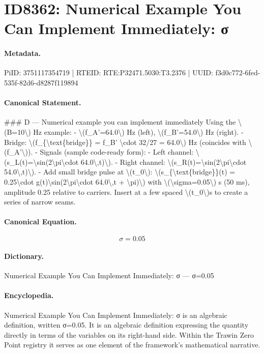 \section*{ID8362: Numerical Example You Can Implement Immediately: σ}
\paragraph{Metadata.}
PiID: 3751117354719 | RTEID: RTE:P32471.5030:T3.2376 | UUID: f3d0c772-6fed-535f-82d6-d8287f119894

\paragraph{Canonical Statement.}
\#\#\# D — Numerical example you can implement immediately Using the \textbackslash{}(B=10\textbackslash{}) Hz example: - \textbackslash{}(f\_A'=64.0\textbackslash{}) Hz (left), \textbackslash{}(f\_B'=54.0\textbackslash{}) Hz (right). - Bridge: \textbackslash{}(f\_\{\textbackslash{}text\{bridge\}\} = f\_B' \textbackslash{}cdot 32/27 = 64.0\textbackslash{}) Hz (coincides with \textbackslash{}(f\_A'\textbackslash{})). - Signals (sample code-ready form): - Left channel: \textbackslash{}(s\_L(t)=\textbackslash{}sin(2\textbackslash{}pi\textbackslash{}cdot 64.0\textbackslash{},t)\textbackslash{}). - Right channel: \textbackslash{}(s\_R(t)=\textbackslash{}sin(2\textbackslash{}pi\textbackslash{}cdot 54.0\textbackslash{},t)\textbackslash{}). - Add small bridge pulse at \textbackslash{}(t\_0\textbackslash{}): \textbackslash{}(s\_\{\textbackslash{}text\{bridge\}\}(t) = 0.25\textbackslash{}cdot g(t)\textbackslash{}sin(2\textbackslash{}pi\textbackslash{}cdot 64.0\textbackslash{},t + \textbackslash{}pi)\textbackslash{}) with \textbackslash{}(\textbackslash{}sigma=0.05\textbackslash{}) s (50 ms), amplitude 0.25 relative to carriers. Insert at a few spaced \textbackslash{}(t\_0\textbackslash{})s to create a series of narrow seams.

\paragraph{Canonical Equation.}
\[
\sigma=0.05
\]

\paragraph{Dictionary.}
Numerical Example You Can Implement Immediately: σ — σ=0.05

\paragraph{Encyclopedia.}
Numerical Example You Can Implement Immediately: σ is an algebraic definition, written σ=0.05. It is an algebraic definition expressing the quantity directly in terms of the variables on its right-hand side. Within the Trawin Zero Point registry it serves as one element of the framework's mathematical narrative.
